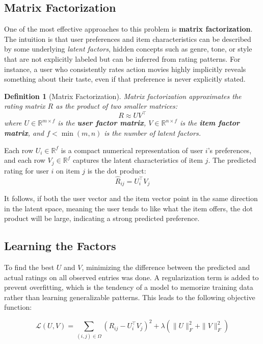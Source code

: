 \documentclass[12pt,a4paper]{report}
\newtheorem{definition}{Definition}[chapter]
\begin{document}
\subsection*{Matrix Factorization}

One of the most effective approaches to this problem is \textbf{matrix factorization}. The intuition is that user preferences and item characteristics can be described by some underlying \textit{latent factors}, hidden concepts such as genre, tone, or style that are not explicitly labeled but can be inferred from rating patterns. For instance, a user who consistently rates action movies highly implicitly reveals something about their taste, even if that preference is never explicitly stated.

\begin{definition}[Matrix Factorization]
Matrix factorization approximates the rating matrix \( R \) as the product of two smaller matrices:
\[
R \approx UV^\top
\]
where \( U \in \mathbb{R}^{m \times f} \) is the \textbf{user factor matrix}, \( V \in \mathbb{R}^{n \times f} \) is the \textbf{item factor matrix}, and \( f < \min(m, n) \) is the number of latent factors.
\end{definition}

Each row \( U_i \in \mathbb{R}^f \) is a compact numerical representation of user \( i \)'s preferences, and each row \( V_j \in \mathbb{R}^f \) captures the latent characteristics of item \( j \). The predicted rating for user \( i \) on item \( j \) is the dot product:
\[
\hat{R}_{ij} = U_i^\top V_j
\]

It follows, if both the user vector and the item vector point in the same direction in the latent space, meaning the user tends to like what the item offers, the dot product will be large, indicating a strong predicted preference.

\subsection*{Learning the Factors}

To find the best \( U \) and \( V \), minimizing the difference between the predicted and actual ratings on all observed entries was done. A regularization term is added to prevent overfitting, which is the tendency of a model to memorize training data rather than learning generalizable patterns. This leads to the following objective function:

\[
\mathcal{L}(U, V) = \sum_{(i,j) \in \Omega} \left( R_{ij} - U_i^\top V_j
\right)^2 + \lambda \left( \|U\|_F^2 + \|V\|_F^2 \right)
\]
\end{document}

